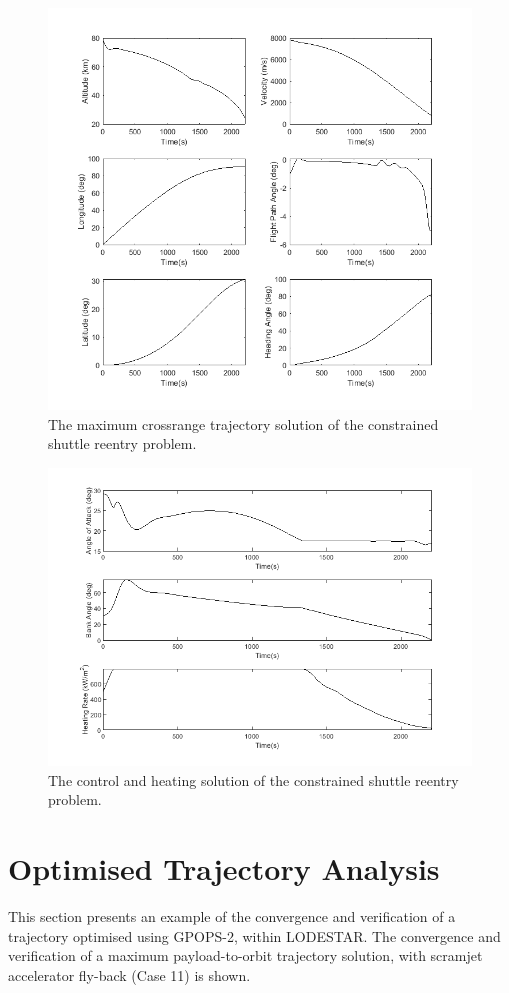 \begin{figure}[H]
\centering
\includegraphics[width=0.7\linewidth]{figures/A1_uncertainty-analysis/SpaceShuttleq1}
\caption{The maximum crossrange trajectory solution of the constrained shuttle reentry problem.}
\label{fig:SpaceShuttleq1}
\end{figure}
\begin{figure}[H]
\centering
\includegraphics[width=0.7\linewidth]{figures/A1_uncertainty-analysis/SpaceShuttleq2}
\caption{The control and heating solution of the constrained shuttle reentry problem.}
\label{fig:SpaceShuttleq2}
\end{figure}



\section{Optimised Trajectory Analysis}

This section presents an example of the convergence and verification of a trajectory optimised using GPOPS-2, within LODESTAR. The convergence and verification of a maximum payload-to-orbit trajectory solution, with scramjet accelerator fly-back (Case 11) is shown. 

